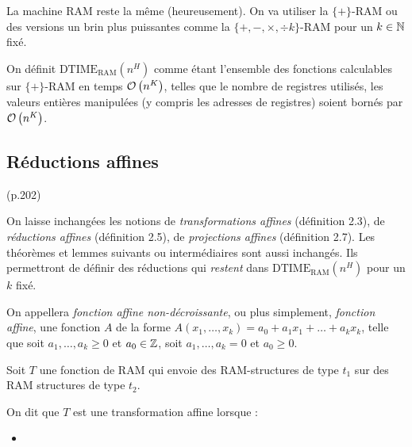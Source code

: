 \documentclass{report}
\newcommand{\dtimeram}{\text{DTIME}_{\text{RAM}}\left( n^H \right)}
\begin{document}
		La machine RAM reste la même (heureusement). On va utiliser la $\{+\}$-RAM ou des versions un brin plus puissantes comme la $\{+ , -, \times, \div k \}$-RAM pour un $k\in \mathbb{N}$ fixé\footnotemark. 
		
		
		\begin{definition}
			\label{def:temps_poly_RAM}
			On définit $\dtimeram$ comme étant l'ensemble des fonctions calculables sur $\{+\}$-RAM en temps $\mathcal{O}\left( n^K \right)$, telles que le nombre de registres utilisés, les valeurs entières manipulées (y compris les adresses de registres) soient bornés par $\mathcal{O}\left( n^K \right)$.
		\end{definition}
		
		
		
		\subsection{Réductions affines} (p.202)
			\label{subsec:reductions_affines}

		On laisse inchangées les notions de \emph{transformations affines} (définition 2.3), de \emph{réductions affines} (définition 2.5), de \emph{projections affines} (définition 2.7). Les théorèmes et lemmes suivants ou intermédiaires sont aussi inchangés. Ils permettront de définir des réductions qui \emph{restent} dans $\dtimeram$ pour un $k$ fixé. 
		
		\begin{definition}
			On appellera \emph{fonction affine non-décroissante}, ou plus simplement, \emph{fonction affine}, une fonction $A$ de la forme $A(x_1, \dots, x_k) = a_0 + a_1 x_1 + \dots + a_k x_k$, telle que soit $a_1, \dots, a_k \geqslant 0$ et $a_0 \in \mathbb{Z}$, soit $a_1, \dots, a_k = 0$ et $a_0 \geqslant 0$.
		\end{definition}
		
		\begin{definition}
			\label{def:transfo_affine}
			Soit $T$ une fonction de RAM qui envoie des RAM-structures de type $t_1$ sur des RAM structures de type $t_2$. 
			
			On dit que $T$ est une transformation affine lorsque : 
			
			
			\begin{itemize}[itemsep=-1mm]
				\item 	
			\end{itemize}
		\end{definition}
		
\end{document}
